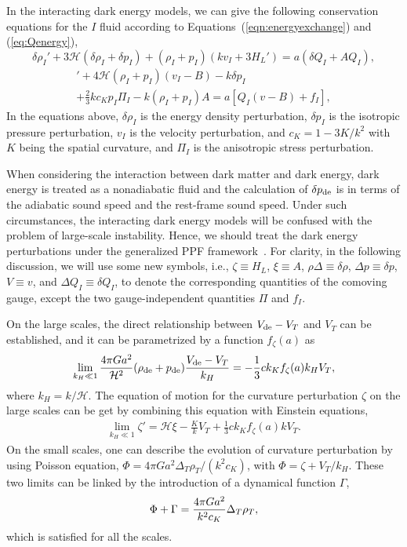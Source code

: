 \documentclass[aps,prd,nofootinbib,amsmath,amssymb,superscriptaddress,twocolumn,10pt]{revtex4}%
\newcommand{\ck}{c_K}
\begin{document}
In the interacting dark energy models, we can give the following conservation equations for the $I$ fluid according to Equations~(\ref{eqn:energyexchange}) and (\ref{eq:Qenergy}),
\begin{equation}
 {\delta\rho_I'}
	+  3\mathcal{H}({\delta \rho_I}+ {\delta p_I})+(\rho_I+p_I)(k{v}_I + 3 H_L')=a(\delta Q_I+AQ_I),\label{eqn:conservation1}
\end{equation}	
\begin{align}	
[(\rho_{I}+p_{I})(v_{I}-B)]'+4\mathcal{H}(\rho_I + p_I)({{v_I}-{B}})-k{ \delta p_I }\nonumber \\
+\frac{2}{3}kc_{K} p_I {\Pi_I}- k(\rho_I+ p_I) {A}=a[Q_I(v-B)+f_I],\label{eqn:conservation2}
\end{align}
In the equations above, $\delta\rho_I$ is the energy density perturbation, $\delta p_I$ is the isotropic pressure perturbation, $v_I$ is the velocity perturbation, and $c_K = 1-3K/k^2$ with $K$ being the spatial curvature, and $\Pi_I$ is the anisotropic stress perturbation.

When considering the interaction between dark matter and dark energy, dark energy is treated as a nonadiabatic fluid and the calculation of $\delta p_{\rm de}$ is in terms of the adiabatic sound speed and the rest-frame sound speed. Under such circumstances, the interacting dark energy models will be confused with the problem of large-scale instability. Hence, we should treat the dark energy perturbations under the generalized PPF framework~\cite{Li:2014eha}. For clarity, in the following discussion, we will use some new symbols, i.e., $\zeta\equiv H_L$, $\xi\equiv A$, $\rho\Delta\equiv\delta\rho$, $\Delta p\equiv\delta p$, $V\equiv v$, and $\Delta Q_I\equiv\delta Q_I$, to denote the corresponding quantities of the comoving gauge, except the two gauge-independent quantities $\Pi$ and $f_I$.

On the large scales, the direct relationship between $V_{\rm de} - V_T$ and $V_T$ can be established, and it can be parametrized by a function $f_\zeta(a)$ as \cite{Hu:2008zd,Fang:2008sn}
\begin{equation}
\lim_{k_H \ll 1}\frac{4\pi G a^2}{\mathcal{H}^2}(\rho_{\rm de} + p_{\rm de})\frac{V_{\rm de} - V_T}{k_H}=-\frac{1}{3}ck_{K} f_\zeta(a) k_H V_T,\label{eq:DEcondition}
\end{equation}
where $k_H=k/\mathcal{H}$. The equation of motion for the curvature perturbation $\zeta$ on the large scales can be get by combining this equation with Einstein equations,
\begin{align}
\lim_{k_H \ll 1} \zeta'  = \mathcal{H}\xi - \frac{K}{k} V_T +\frac{1}{3} ck_{K}  f_\zeta(a) k V_T.
\label{eqn:zetaprimesh}
\end{align}
On the small scales, one can describe the evolution of curvature perturbation by using Poisson equation, $\Phi=4\pi G a^2\Delta_T \rho_T/( k^2\ck)$, with $\Phi=\zeta+V_T/k_H$. These two limits can be linked by the introduction of a dynamical function $\Gamma$,
\begin{equation}
\Phi+\Gamma = {4\pi Ga^2
\over  k^2\ck} \Delta_T \rho_T,
\label{eqn:modpoiss}
\end{equation}
which is satisfied for all the scales.
\end{document}
